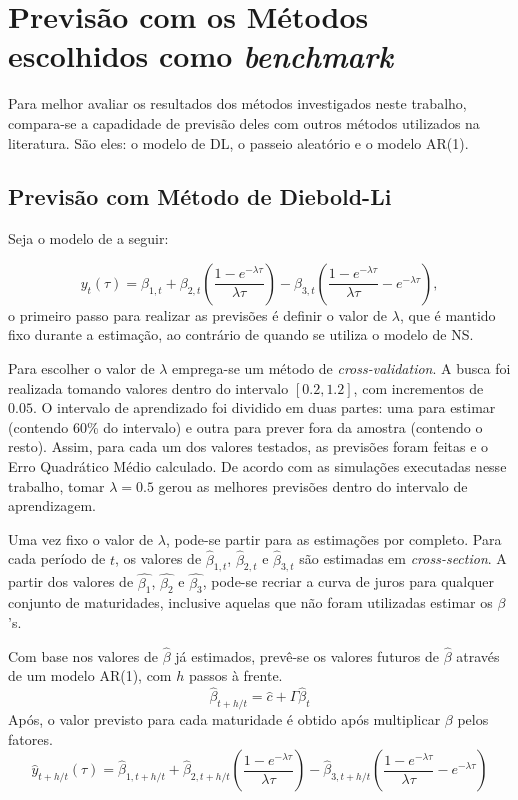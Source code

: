\documentclass[
	12pt,				%
	openright,			%
	oneside,			%
	a4paper,			%
	english,			%
	brazil				%
	]{dissertacao-ufrgs-abntex2}
\begin{document}
\section{Previsão com os Métodos escolhidos como \emph{benchmark}}

Para melhor avaliar os resultados dos métodos investigados neste trabalho, compara-se a capadidade de previsão deles com outros métodos utilizados na literatura. São eles: o modelo de DL, o passeio aleatório e o modelo AR(1).

\subsection{Previsão com Método de Diebold-Li}

Seja o modelo de  a seguir:

$$y_{t}(\tau)=\beta_{1,t}+\beta_{2,t}\left( \frac { 1-e^{ -\lambda \tau  } }{ \lambda\tau}  \right) -\beta_{3,t}\left( \frac { 1-e^{ -\lambda \tau  } }{ \lambda \tau  } -e^{ -\lambda \tau  } \right),$$
o primeiro passo para realizar as previsões é definir o valor de $\lambda$, que é mantido fixo durante a estimação, ao contrário de quando se utiliza o modelo de NS. 

Para escolher o valor de $\lambda$ emprega-se um método de \emph{cross-validation}. A busca foi realizada tomando valores dentro do intervalo $[0.2,1.2]$, com incrementos de $0.05$. O intervalo de aprendizado foi dividido em duas partes: uma para estimar (contendo 60\% do intervalo) e outra para prever fora da amostra (contendo o resto). Assim, para cada um dos valores testados, as previsões foram feitas e o Erro Quadrático Médio calculado. 
De acordo com as simulações executadas nesse trabalho, tomar $\lambda=0.5$ gerou as melhores previsões dentro do intervalo de aprendizagem.

Uma vez fixo o valor de $\lambda$, pode-se partir para as estimações por completo. Para cada período de $t$, os valores de $\hat{\beta}_{1,t}$, $\hat{\beta}_{2,t}$ e $\hat{\beta}_{3,t}$ são estimadas em \emph{cross-section}. A partir dos valores de  $\hat{\beta_1}$, $\hat{\beta_2}$ e $\hat{\beta_3}$, pode-se recriar a curva de juros para qualquer conjunto de maturidades, inclusive aquelas que não foram utilizadas estimar os $\beta$'s.

Com base nos valores de $\hat{\beta}$ já estimados, prevê-se os valores futuros de $\hat{\beta}$ através de um modelo AR(1), com $h$ passos à frente. 
$$\hat{\beta} _{ t+h/t } = \hat{c} + \hat{\Gamma}\hat{\beta}_t$$
Após, o valor previsto para cada maturidade é obtido após multiplicar $\beta$ pelos fatores.
$$\hat { y } _{ t+h/t }(\tau)=\hat{\beta} _{ 1,t+h/t }+\hat{\beta} _{ 2,t+h/t }\left( \frac { 1-e^{ -\lambda \tau  } }{ \lambda \tau  }  \right) -\hat{\beta} _{ 3,t+h/t }\left( \frac { 1-e^{ -\lambda \tau  } }{ \lambda \tau  } -e^{ -\lambda \tau  } \right)$$
\end{document}

